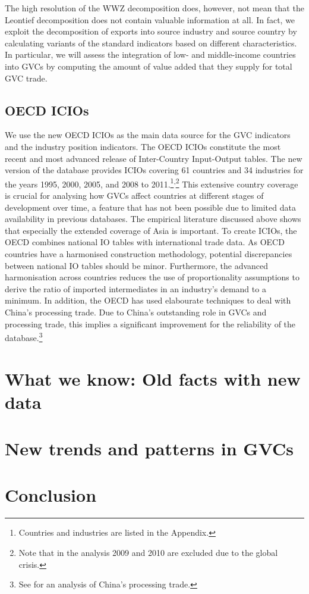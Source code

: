 \documentclass[11pt,a4paper]{article}
\begin{document}
The high resolution of the WWZ decomposition does, however, not mean that the Leontief decomposition does not contain valuable information at all. In fact, we exploit the decomposition of exports into source industry and source country by calculating variants of the standard indicators based on different characteristics. In particular, we will assess the integration of low- and middle-income countries into GVCs by computing the amount of value added that they supply for total GVC trade.


\subsection{OECD ICIOs}\label{sub:icios}
We use the new OECD ICIOs as the main data source for the GVC indicators and the industry position indicators. The OECD ICIOs constitute the most recent and most advanced release of Inter-Country Input-Output tables. The new version of the database provides ICIOs covering 61 countries and 34 industries for the years 1995, 2000, 2005, and 2008 to 2011.\footnote{Countries and industries are listed in the Appendix.}\textsuperscript{,}\footnote{Note that in the analysis 2009 and 2010 are excluded due to the global crisis.} This extensive country coverage is crucial for analysing how GVCs affect countries at different stages of development over time, a feature that has not been possible due to limited data availability in previous databases. The empirical literature discussed above shows that especially the extended coverage of Asia is important. To create ICIOs, the OECD combines national IO tables with international trade data. As OECD countries have a harmonised construction methodology, potential discrepancies between national IO tables should be minor. Furthermore, the advanced harmonisation across countries reduces the use of proportionality assumptions to derive the ratio of imported intermediates in an industry's demand to a minimum. In addition, the OECD has used elabourate techniques to deal with China's processing trade. Due to China's outstanding role in GVCs and processing trade, this implies a significant improvement for the reliability of the database.\footnote{See \citet{rokoetal12} for an analysis of China's processing trade.}



\section{What we know: Old facts with new data}\label{sec:basics}



\section{New trends and patterns in GVCs}\label{sec:news}



\section{Conclusion}\label{sec:conclusion}

\clearpage




\clearpage
\end{document}

